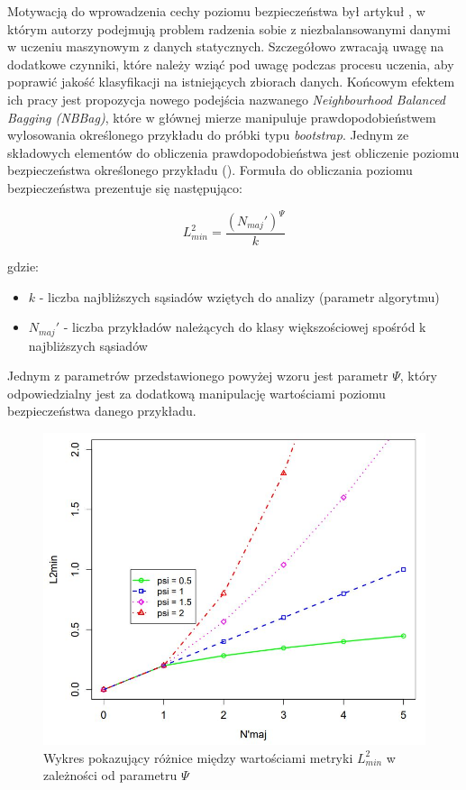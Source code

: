 Motywacją do wprowadzenia cechy poziomu bezpieczeństwa był artykuł \cite{Article:NNBag}, w którym autorzy podejmują problem radzenia sobie z niezbalansowanymi danymi w uczeniu maszynowym z danych statycznych. Szczegółowo zwracają uwagę na dodatkowe czynniki, które należy wziąć pod uwagę podczas procesu uczenia, aby poprawić jakość klasyfikacji na istniejących zbiorach danych. Końcowym efektem ich pracy jest propozycja nowego podejścia nazwanego \textit{Neighbourhood Balanced Bagging (NBBag)}, które w głównej mierze manipuluje prawdopodobieństwem wylosowania określonego przykładu do próbki typu \textit{bootstrap}. Jednym ze składowych elementów do obliczenia prawdopodobieństwa jest obliczenie poziomu bezpieczeństwa określonego przykładu (). Formuła do obliczania poziomu bezpieczeństwa prezentuje się następująco:

\begin{equation}
    L^2_{min} = \frac{(N_{maj}')^\Psi}{k}
\end{equation}

\noindent gdzie:

\begin{itemize}
    \item $k$ - liczba najbliższych sąsiadów wziętych do analizy (parametr algorytmu)
    \item $N_{maj}'$ - liczba przykładów należących do klasy większościowej spośród k najbliższych sąsiadów
\end{itemize}

\noindent Jednym z parametrów przedstawionego powyżej wzoru jest parametr $\Psi$, który odpowiedzialny jest za dodatkową manipulację wartościami poziomu bezpieczeństwa danego przykładu.

\begin{figure}[h]
    \centering
    \includegraphics[width=13cm]{figures/psi_coeff.JPG}
    \caption{Wykres pokazujący różnice między wartościami metryki $L^2_{min}$ w zależności od parametru $\Psi$ \cite{Article:NNBag}}\label{Figure:PsiCoefficient}
\end{figure}

